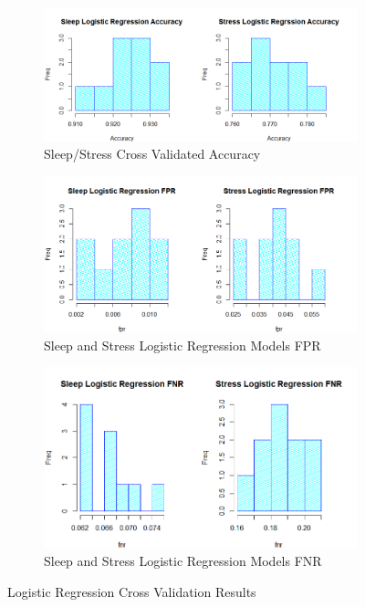 \documentclass{article}
\begin{document}
\begin{figure}[H]
\begin{subfigure}[b]{\linewidth}
	\includegraphics[width=\linewidth]
	{Images/Sleep and Stress LR Accuracies.png}
	\caption{Sleep/Stress Cross Validated Accuracy}
\end{subfigure}
\begin{subfigure}[b]{\linewidth}
	\includegraphics[width=\linewidth]
	{images/Sleep Stress FPR.png}
	\caption{Sleep and Stress Logistic Regression Models FPR}
\end{subfigure}
\begin{subfigure}[b]{\linewidth}
	\includegraphics[width=\linewidth]
	{images/Sleep Stress FNR.png}
	\caption{Sleep and Stress Logistic Regression Models FNR}
\end{subfigure}
\caption{Logistic Regression Cross Validation Results}
\label{fig:LR Cross Validation Results}
\end{figure}
\end{document}
